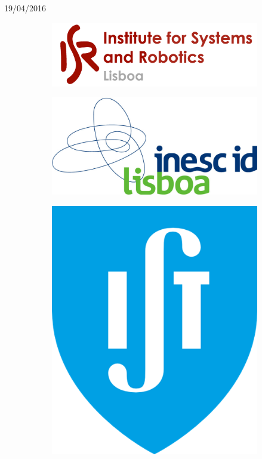 \begin{titlepage}


{\large 19/04/2016}\\[1cm] %




\begin{figure}
\centering
\begin{subfigure}{.5\textwidth}
  \centering
  \includegraphics[width=.5\linewidth]{isr-logo.png}
\end{subfigure}%
\begin{subfigure}{.5\textwidth}
  \centering
  \includegraphics[width=.5\linewidth]{inesc-id-logo.png}
\end{subfigure}
\begin{subfigure}{.5\textwidth}
  \centering
  \includegraphics[width=.25\linewidth]{ist-logo.png}
\end{subfigure}
\end{figure}
 

\end{titlepage}
